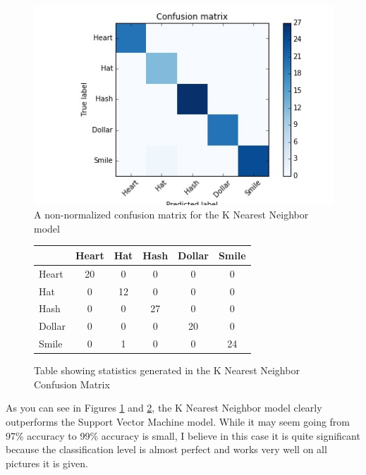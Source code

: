 \documentclass{article}
\begin{document}
	\newpage
	
	\begin{figure}[!htb]
		\centering
		\includegraphics[scale=.5]{KNN_CM.jpg}
		\caption{A non-normalized confusion matrix for the K Nearest Neighbor model}
		\label{fig:KNN_CM}
	\end{figure}
	
	\begin{figure}[!htb]
		\centering
		\begin{tabular}{|l|c|c|c|c|c|} 
			\hline 
			& Heart & Hat & Hash & Dollar & Smile \\
			\hline
			Heart & 20 & 0 & 0 & 0 & 0 \\
			Hat & 0 & 12 & 0 & 0 & 0 \\
			Hash & 0 & 0 & 27 & 0 & 0 \\
			Dollar & 0 & 0 & 0 & 20 & 0 \\
			Smile & 0 & 1 & 0 & 0 & 24 \\
			\hline
		\end{tabular}
		\caption{Table showing statistics generated in the K Nearest Neighbor Confusion Matrix}
		\label{KNN_Data}
	\end{figure}
		
	As you can see in Figures \ref{fig:KNN_CM} and \ref{KNN_Data}, the K Nearest Neighbor model clearly outperforms the Support Vector Machine model. While it may seem going from 97\% accuracy to 99\% accuracy is small, I believe in this case it is quite significant because the classification level is almost perfect and works very well on all pictures it is given. 
	
\end{document}
